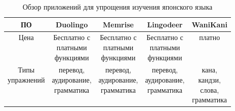 \begin{table}[ht]
  \caption{Обзор приложений для упрощения изучения японского языка}
  \label{tab:jap-apps}
  \begin{center}
    \begin{tabular}{|c|c|c|c|c|}
      \hline
      ПО & Duolingo & Memrise & Lingodeer & WaniKani \\
      \hline
      Цена & \makecell{Бесплатно с \\ платными \\ функциями} & \makecell{Бесплатно с\\ платными \\ функциями} & \makecell{Бесплатно с \\ платными \\ функциями} & платно \\
      \hline
      \makecell{Типы \\ упражнений} & \makecell{перевод, \\ аудирование, \\ грамматика} & \makecell{перевод, \\ аудирование, \\ грамматика} & \makecell{перевод, \\ аудирование, \\ грамматика} & \makecell{кана, \\ кандзи, \\ слова, \\ грамматика} \\
      \hline
    \end{tabular}
  \end{center}
\end{table}


